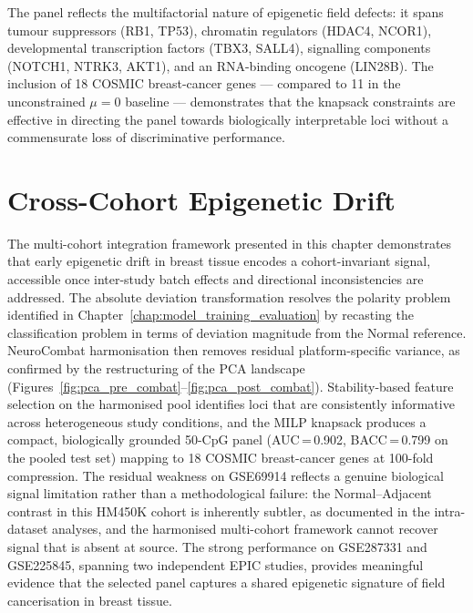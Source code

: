 The panel reflects the multifactorial nature of epigenetic field defects:
it spans tumour suppressors (RB1, TP53), chromatin regulators (HDAC4, NCOR1),
developmental transcription factors (TBX3, SALL4), signalling components
(NOTCH1, NTRK3, AKT1), and an RNA-binding oncogene (LIN28B).
The inclusion of 18 COSMIC breast-cancer genes --- compared to 11 in the
unconstrained $\mu = 0$ baseline --- demonstrates that the knapsack constraints
are effective in directing the panel towards biologically interpretable loci
without a commensurate loss of discriminative performance.

\section{Cross-Cohort Epigenetic Drift}

The multi-cohort integration framework presented in this chapter demonstrates
that early epigenetic drift in breast tissue encodes a cohort-invariant signal,
accessible once inter-study batch effects and directional inconsistencies are
addressed.
The absolute deviation transformation resolves the polarity problem identified
in Chapter~\ref{chap:model_training_evaluation} by recasting the classification problem in
terms of deviation magnitude from the Normal reference.
NeuroCombat harmonisation then removes residual platform-specific variance,
as confirmed by the restructuring of the PCA landscape
(Figures~\ref{fig:pca_pre_combat}--\ref{fig:pca_post_combat}).
Stability-based feature selection on the harmonised pool identifies loci that
are consistently informative across heterogeneous study conditions, and the
MILP knapsack produces a compact, biologically grounded 50-CpG panel
(AUC\,=\,0.902, BACC\,=\,0.799 on the pooled test set) mapping to 18 COSMIC
breast-cancer genes at 100-fold compression.
The residual weakness on GSE69914 reflects a genuine biological signal
limitation rather than a methodological failure: the Normal--Adjacent contrast
in this HM450K cohort is inherently subtler, as documented in the
intra-dataset analyses, and the harmonised multi-cohort framework cannot
recover signal that is absent at source.
The strong performance on GSE287331 and GSE225845, spanning two independent
EPIC studies, provides meaningful evidence that the selected panel captures a
shared epigenetic signature of field cancerisation in breast tissue.